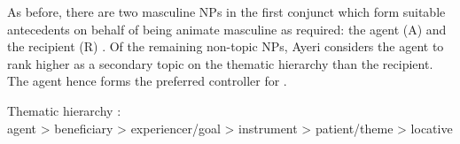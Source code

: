 \begin{morphlex}
\pex
\a {}

\a{}
\xe
\end{morphlex}

As before, there are two masculine NPs in the first conjunct which form
suitable antecedents on behalf of being animate masculine as required: the
agent (A)  and the recipient (R) . Of the
remaining non-topic NPs, Ayeri considers the agent to rank higher as a
secondary topic on the thematic hierarchy than the recipient. The agent hence
forms the preferred controller for .

\ex Thematic hierarchy \citep[329]{bresnan2016}:\medskip \\
	agent > beneficiary > experiencer/goal > instrument > patient/theme >
	locative
\xe


